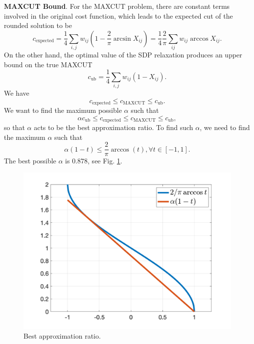 \documentclass[
]{book}
\theoremstyle{definition}
\theoremstyle{definition}
\theoremstyle{definition}
\theoremstyle{definition}
\theoremstyle{remark}
\begin{document}
\textbf{MAXCUT Bound}. For the MAXCUT problem, there are constant terms involved in the original cost function, which leads to the expected cut of the rounded solution to be
\[
c_{\mathrm{expected}} = \frac{1}{4} \sum_{i,j} w_{ij} \left( 1- \frac{2}{\pi} \arcsin X_{ij} \right) = \frac{1}{4} \frac{2}{\pi} \sum_{ij} w_{ij} \arccos X_{ij}.
\]
On the other hand, the optimal value of the SDP relaxation produces an upper bound on the true MAXCUT
\[
c_{\mathrm{ub}} = \frac{1}{4} \sum_{i,j} w_{ij} (1 - X_{ij}).
\]
We have
\[
c_{\mathrm{expected}} \leq c_{\mathrm{MAXCUT}} \leq c_{\mathrm{ub}}.
\]
We want to find the maximum possible \(\alpha\) such that
\[
\alpha c_{\mathrm{ub}} \leq c_{\mathrm{expected}} \leq c_{\mathrm{MAXCUT}} \leq c_{\mathrm{ub}},
\]
so that \(\alpha\) acts to be the best approximation ratio. To find such \(\alpha\), we need to find the maximum \(\alpha\) such that
\[
\alpha (1 - t) \leq \frac{2}{\pi} \arccos(t), \forall t \in [-1,1].
\]
The best possible \(\alpha\) is \(0.878\), see Fig. \ref{fig:MAXCUTAlpha}.

\begin{figure}

{\centering \includegraphics[width=0.6\linewidth]{images/maxcut_alpha} 

}

\caption{Best approximation ratio.}\label{fig:MAXCUTAlpha}
\end{figure}

  
\end{document}
